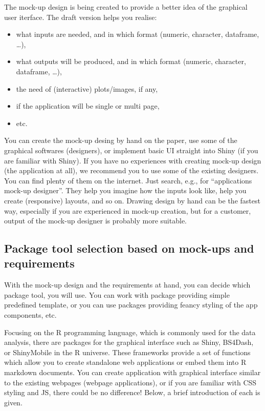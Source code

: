 \documentclass[
]{article}
\providecommand{\tightlist}{%
  \setlength{\itemsep}{0pt}\setlength{\parskip}{0pt}}
\begin{document}
The mock-up design is being created to provide a better idea of the
graphical user iterface. The draft version helps you realise:

\begin{itemize}
\tightlist
\item
  what inputs are needed, and in which format (numeric, character,
  dataframe, \ldots),
\item
  what outputs will be produced, and in which format (numeric,
  character, dataframe, \ldots),
\item
  the need of (interactive) plots/images, if any,
\item
  if the application will be single or multi page,
\item
  etc.
\end{itemize}

You can create the mock-up desing by hand on the paper, use some of the
graphical softwares (designers), or implement basic UI straight into
Shiny (if you are familiar with Shiny). If you have no experiences with
creating mock-up design (the application at all), we recommend you to
use some of the existing designers. You can find plenty of them on the
internet. Just search, e.g., for ``applications mock-up designer''. They
help you imagine how the inputs look like, help you create (responsive)
layouts, and so on. Drawing design by hand can be the fastest way,
especially if you are experienced in mock-up creation, but for a
customer, output of the mock-up designer is probably more suitable.

\hypertarget{package-tool-selection-based-on-mock-ups-and-requirements}{%
\subsection{Package tool selection based on mock-ups and
requirements}\label{package-tool-selection-based-on-mock-ups-and-requirements}}

With the mock-up design and the requirements at hand, you can decide
which package tool, you will use. You can work with package providing
simple predefined template, or you can use packages providing feancy
styling of the app components, etc.

Focusing on the R programming language, which is commonly used for the
data analysis, there are packages for the graphical interface such as
Shiny, BS4Dash, or ShinyMobile in the R universe. These frameworks
provide a set of functions which allow you to create standalone web
applications or embed them into R markdown documents. You can create
application with graphical interface similar to the existing webpages
(webpage applications), or if you are familiar with CSS styling and JS,
there could be no difference! Below, a brief introduction of each is
given.
\end{document}
